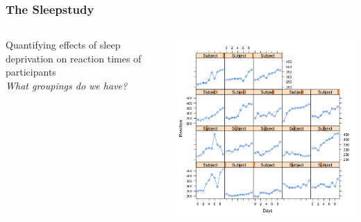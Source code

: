 \documentclass{beamer}
\begin{document}
\begin{frame}
    \frametitle{The Sleepstudy}
    \begin{columns}
        \begin{column}{0.45\textwidth}
            \Large
            Quantifying effects of sleep deprivation on reaction times of participants\\
            \textit{What groupings do we have?}
        \end{column}
        \begin{column}{0.55\textwidth}
            \includegraphics[width=\textwidth]{lectures/day_12_bayesian_lm_II/figures/unnamed-chunk-2-1.png}
        \end{column}
    \end{columns}
\end{frame}
\end{document}
